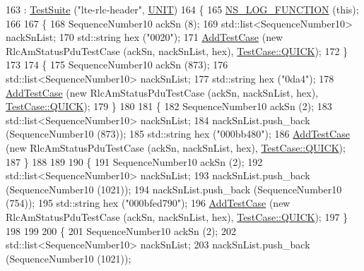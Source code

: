 \begin{DoxyCode}
163   : \hyperlink{classns3_1_1TestSuite_a904b0c40583b744d30908aeb94636d1a}{TestSuite} (\textcolor{stringliteral}{"lte-rlc-header"}, \hyperlink{classns3_1_1TestSuite_a1ebfcab34ec8161e085e8e3a1855eae0a3885375a3787abf60431f8454b3cadbd}{UNIT})
164 \{
165   \hyperlink{log-macros-disabled_8h_a90b90d5bad1f39cb1b64923ea94c0761}{NS\_LOG\_FUNCTION} (\textcolor{keyword}{this});
166 
167   \{
168     SequenceNumber10 ackSn (8);
169     std::list<SequenceNumber10> nackSnList;
170     std::string hex (\textcolor{stringliteral}{"0020"});
171     \hyperlink{classns3_1_1TestCase_a3718088e3eefd5d6454569d2e0ddd835}{AddTestCase} (\textcolor{keyword}{new} RlcAmStatusPduTestCase (ackSn, nackSnList, hex), 
      \hyperlink{classns3_1_1TestCase_a11f6f57c21a0d32e605d192a89550f91ac2f47fb646e77f4ce7d662a69120965f}{TestCase::QUICK});
172   \}
173 
174   \{
175     SequenceNumber10 ackSn (873);
176     std::list<SequenceNumber10> nackSnList;
177     std::string hex (\textcolor{stringliteral}{"0da4"});
178     \hyperlink{classns3_1_1TestCase_a3718088e3eefd5d6454569d2e0ddd835}{AddTestCase} (\textcolor{keyword}{new} RlcAmStatusPduTestCase (ackSn, nackSnList, hex), 
      \hyperlink{classns3_1_1TestCase_a11f6f57c21a0d32e605d192a89550f91ac2f47fb646e77f4ce7d662a69120965f}{TestCase::QUICK});
179   \}
180 
181   \{
182     SequenceNumber10 ackSn (2);
183     std::list<SequenceNumber10> nackSnList;
184     nackSnList.push\_back (SequenceNumber10 (873));
185     std::string hex (\textcolor{stringliteral}{"000bb480"});
186     \hyperlink{classns3_1_1TestCase_a3718088e3eefd5d6454569d2e0ddd835}{AddTestCase} (\textcolor{keyword}{new} RlcAmStatusPduTestCase (ackSn, nackSnList, hex), 
      \hyperlink{classns3_1_1TestCase_a11f6f57c21a0d32e605d192a89550f91ac2f47fb646e77f4ce7d662a69120965f}{TestCase::QUICK});
187   \}
188 
189 
190   \{
191     SequenceNumber10 ackSn (2);
192     std::list<SequenceNumber10> nackSnList;
193     nackSnList.push\_back (SequenceNumber10 (1021));
194     nackSnList.push\_back (SequenceNumber10 (754));
195     std::string hex (\textcolor{stringliteral}{"000bfed790"});
196     \hyperlink{classns3_1_1TestCase_a3718088e3eefd5d6454569d2e0ddd835}{AddTestCase} (\textcolor{keyword}{new} RlcAmStatusPduTestCase (ackSn, nackSnList, hex), 
      \hyperlink{classns3_1_1TestCase_a11f6f57c21a0d32e605d192a89550f91ac2f47fb646e77f4ce7d662a69120965f}{TestCase::QUICK});
197   \}
198 
199 
200   \{
201     SequenceNumber10 ackSn (2);
202     std::list<SequenceNumber10> nackSnList;
203     nackSnList.push\_back (SequenceNumber10 (1021));

\end{DoxyCode}
